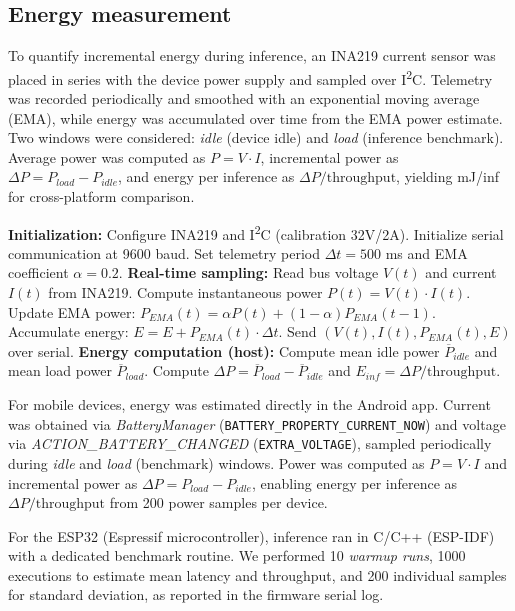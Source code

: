 \subsection{Energy measurement}
To quantify incremental energy during inference, an INA219 current sensor was placed in series with
the device power supply and sampled over I\textsuperscript{2}C. Telemetry was recorded periodically
and smoothed with an exponential moving average (EMA), while energy was accumulated over time from the
EMA power estimate. Two windows were considered: \textit{idle} (device idle) and \textit{load}
(inference benchmark). Average power was computed as $P = V \cdot I$, incremental power as
$\Delta P = P_{load} - P_{idle}$, and energy per inference as $\Delta P / \mathrm{throughput}$,
yielding mJ/inf for cross-platform comparison.

\begin{algorithm}[H]
\caption{Energy measurement procedure using the INA219 sensor.}
\begin{algorithmic}[1]
\STATE \textbf{Initialization:}
\STATE Configure INA219 and I\textsuperscript{2}C (calibration 32V/2A).
\STATE Initialize serial communication at 9600 baud.
\STATE Set telemetry period $\Delta t = 500$ ms and EMA coefficient $\alpha = 0.2$.
\STATE \textbf{Real-time sampling:}
\STATE Read bus voltage $V(t)$ and current $I(t)$ from INA219.
\STATE Compute instantaneous power $P(t) = V(t)\cdot I(t)$.
\STATE Update EMA power: $P_{EMA}(t) = \alpha P(t) + (1-\alpha)P_{EMA}(t-1)$.
\STATE Accumulate energy: $E = E + P_{EMA}(t)\cdot \Delta t$.
\STATE Send $(V(t), I(t), P_{EMA}(t), E)$ over serial.
\ENDWHILE
\STATE \textbf{Energy computation (host):}
\STATE Compute mean idle power $\overline{P}_{idle}$ and mean load power $\overline{P}_{load}$.
\STATE Compute $\Delta P = \overline{P}_{load} - \overline{P}_{idle}$ and $E_{inf} = \Delta P / \text{throughput}$.
\end{algorithmic}
\end{algorithm}

For mobile devices, energy was estimated directly in the Android app. Current was obtained via
\textit{BatteryManager} (\texttt{BATTERY\_PROPERTY\_CURRENT\_NOW}) and voltage via
\textit{ACTION\_BATTERY\_CHANGED} (\texttt{EXTRA\_VOLTAGE}), sampled periodically during \textit{idle}
and \textit{load} (benchmark) windows. Power was computed as $P = V \cdot I$ and incremental power as
$\Delta P = P_{load} - P_{idle}$, enabling energy per inference as $\Delta P / \mathrm{throughput}$
from 200 power samples per device.

For the ESP32 (Espressif microcontroller), inference ran in C/C++ (ESP-IDF) with a dedicated benchmark
routine. We performed 10 \textit{warmup runs}, 1000 executions to estimate mean latency and throughput,
and 200 individual samples for standard deviation, as reported in the firmware serial log.

